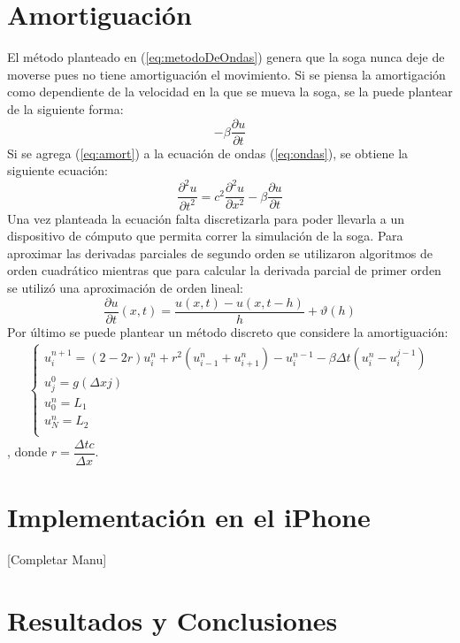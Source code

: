 \documentclass[11pt,a4paper]{emulateapj}
\begin{document}
\section{Amortiguación}
El método planteado en (\ref{eq:metodoDeOndas}) genera que la soga nunca deje de moverse pues no tiene amortiguación el movimiento. Si se piensa la amortigación como dependiente de la velocidad en la que se mueva la soga, se la puede plantear de la siguiente forma:
\begin{equation}
\label{eq:amort}
-\beta \frac{\partial u}{\partial t}
\end{equation}
Si se agrega (\ref{eq:amort}) a la ecuación de ondas (\ref{eq:ondas}), se obtiene la siguiente ecuación:
\begin{equation}
\label{eq:amort}
\frac{\partial ^2 u}{\partial t^2} = c^2 \frac{\partial ^2 u}{\partial x^2} - \beta \frac{\partial u}{\partial t} 
\end{equation}
Una vez planteada la ecuación falta discretizarla para poder llevarla a un dispositivo de cómputo que permita correr la simulación de la soga. Para aproximar las derivadas parciales de segundo orden se utilizaron algoritmos de orden cuadrático mientras que para calcular la derivada parcial de primer orden se utilizó una aproximación de orden lineal:
\begin{equation}
\frac{\partial u}{\partial t}(x,t) = \frac{u(x,t) - u(x,t-h)}{h} +\vartheta(h)
\end{equation}
Por último se puede plantear un método discreto que considere la amortiguación:
\begin{eqnarray}
	\label{eq:metodoDeOndas}
	\left\{
		\begin{matrix}
			u_i^{n+1} = (2-2r) u_i^n + r^2 (u_{i-1}^n+u_{i+1}^n) - u_i^{n-1} - \beta\Delta t(u_i^n - u_i^{j-1})\\
			u_j^0 = g(\Delta x j)\\
			u_0^n = L_1\\ 
			u_N^n = L_2\\
		\end{matrix} \right.
\end{eqnarray}	
, donde $r = \dfrac{\Delta t c}{\Delta x}$.

\section{Implementación en el iPhone}
[Completar Manu]
\section{Resultados y Conclusiones}
\label{sec:resultadosyconclusiones}

%
%

\end{document}
